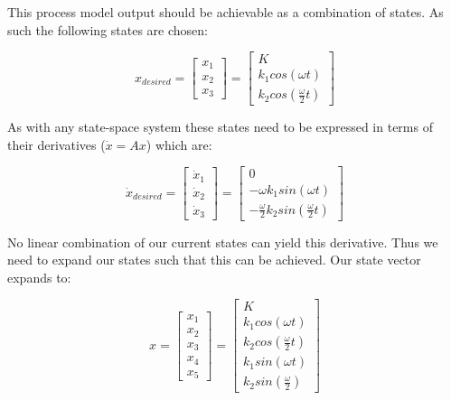 This process model output should be achievable as a combination of states. As such the following states are chosen:

\begin{equation} \label{eq:consump_x}
	x_{desired} =  \begin{bmatrix}
		x_1 \\
		x_2 \\
		x_3
	\end{bmatrix}
	=
	\begin{bmatrix}
		K \\
		k_1 cos(\omega t) \\
		k_2 cos(\frac{\omega}{2} t)
	\end{bmatrix}
\end{equation}

As with any state-space system these states need to be expressed in terms of their derivatives ($\dot x = Ax$) which are:

\begin{equation} \label{eq:consump_x_deriv_s}
	\dot x_{desired}  = \begin{bmatrix}
		\dot x_1 \\
		\dot x_2 \\
		\dot x_3
	\end{bmatrix}
	=
	\begin{bmatrix}
		0 \\
		- \omega k_1 sin(\omega t) \\
		- \frac{\omega}{2} k_2 sin(\frac{\omega}{2} t)
	\end{bmatrix}
\end{equation}

No linear combination of our current states can yield this derivative. Thus we need to expand our states such that this can be achieved. Our state vector expands to:

\begin{equation} \label{eq:consump_x_l}
		x =  \begin{bmatrix}
			x_1 \\
			x_2 \\
			x_3 \\
			x_4 \\
			x_5
		\end{bmatrix}
		=
		 \begin{bmatrix}
		K \\
		k_1 cos(\omega t) \\
		k_2 cos(\frac{\omega}{2} t) \\
		k_1 sin(\omega t) \\
		k_2 sin(\frac{\omega}{2}) 
	\end{bmatrix}
\end{equation}

